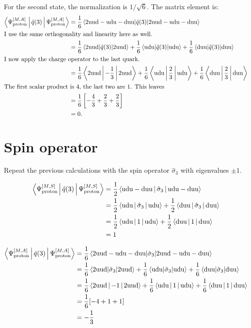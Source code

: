 \documentclass[11pt, english, fleqn, DIV=15, headinclude, BCOR=1cm]{scrartcl}
\begin{document}
For the second state, the normalization is $1/\sqrt 6$. The matrix element is:
\begin{align*}
    \Braket{\Pp A | \hat q(3) | \Pp A}
    &= \frac{1}{6} \braket{2 \text{uud} - \text{udu} - \text{duu} | \hat q(3) | 2
    \text{uud} - \text{udu} - \text{duu}} \\
    \intertext{%
        I use the same orthogonality and linearity here as well.
    }
    &= \frac{1}{6} \braket{2 \text{uud} | \hat q(3) | 2 \text{uud}}
    + \frac{1}{6} \braket{\text{udu} | \hat q(3) | \text{udu}}
    + \frac{1}{6} \braket{\text{duu} | \hat q(3) | \text{duu}} \\
    \intertext{%
        I now apply the charge operator to the last quark.
    }
    &= \frac{1}{6} \Braket{2 \text{uud} | -\frac13 | 2 \text{uud}}
    + \frac{1}{6} \Braket{\text{udu} | \frac 23 | \text{udu}}
    + \frac{1}{6} \Braket{\text{duu} | \frac 23 | \text{duu}} \\
    \intertext{%
        The first scalar product is 4, the last two are 1. This leaves
    }
    &= \frac 16 \sbr{- \frac 43 + \frac 23 + \frac 23} \\
    &= 0.
\end{align*}

\section{Spin operator}

\begin{problem}
    Repeat the previous calculations with the spin operator $\hat \sigma_3$
    with eigenvalues $\pm 1$.
\end{problem}

\begin{align*}
    \Braket{\Psi_\text{proton}^{[M,S]} | \hat q(3) | \Psi_\text{proton}^{[M,S]}}
    &= \frac 12 \Braket{\text{udu} - \text{duu} | \hat \sigma_3 | \text{udu} - \text{duu}} \\
    &= \frac 12 \Braket{\text{udu} | \hat \sigma_3 | \text{udu}}
    + \frac 12 \Braket{\text{duu} | \hat \sigma_3 | \text{duu}} \\
    &= \frac 12 \Braket{\text{udu} | 1 | \text{udu}}
    + \frac 12 \Braket{\text{duu} | 1 | \text{duu}} \\
    &= 1
\end{align*}

\begin{align*}
    \Braket{\Psi_\text{proton}^{[M,A]} | \hat q(3) | \Psi_\text{proton}^{[M,A]}}
    &= \frac{1}{6} \braket{2 \text{uud} - \text{udu} - \text{duu} | \hat
    \sigma_3 | 2 \text{uud} - \text{udu} - \text{duu}} \\
    &= \frac{1}{6} \braket{2 \text{uud} | \hat \sigma_3 | 2 \text{uud}}
    + \frac{1}{6} \braket{\text{udu} | \hat \sigma_3 | \text{udu}}
    + \frac{1}{6} \braket{\text{duu} | \hat \sigma_3 | \text{duu}} \\
    &= \frac{1}{6} \Braket{2 \text{uud} | -1 | 2 \text{uud}}
    + \frac{1}{6} \Braket{\text{udu} | 1 | \text{udu}}
    + \frac{1}{6} \Braket{\text{duu} | 1 | \text{duu}} \\
    &= \frac 16 [-4 + 1 + 1] \\
    &= - \frac 13
\end{align*}
\end{document}
